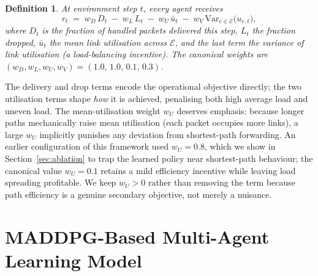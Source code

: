 \documentclass[10pt,journal,comsoc]{IEEEtran}
\newtheorem{definition}{Definition}
\begin{document}
\begin{definition}
  \label{def:reward_function}
  At environment step $t$, every agent receives
  \begin{equation}
    r_t \;=\; w_D\, D_t \;-\; w_L\, L_t \;-\; w_U\, \bar{u}_t \;-\; w_V\, \mathrm{Var}_{e\in\mathcal{E}}\big(u_{e,t}\big),
    \label{eq:reward_function}
  \end{equation}
  where $D_t$ is the fraction of handled packets delivered this step, $L_t$ the fraction dropped, $\bar{u}_t$ the mean link utilisation across $\mathcal{E}$, and the last term the variance of link utilisation (a load-balancing incentive). The canonical weights are $(w_D, w_L, w_U, w_V) = (1.0,\, 1.0,\, 0.1,\, 0.3)$.
\end{definition}

The delivery and drop terms encode the operational objective directly; the two utilisation terms shape \emph{how} it is achieved, penalising both high average load and uneven load. The mean-utilisation weight $w_U$ deserves emphasis: because longer paths mechanically raise mean utilisation (each packet occupies more links), a large $w_U$ implicitly punishes any deviation from shortest-path forwarding. An earlier configuration of this framework used $w_U = 0.8$, which we show in Section~\ref{sec:ablation} to trap the learned policy near shortest-path behaviour; the canonical value $w_U = 0.1$ retains a mild efficiency incentive while leaving load spreading profitable. We keep $w_U > 0$ rather than removing the term because path efficiency is a genuine secondary objective, not merely a nuisance.

\section{MADDPG-Based Multi-Agent Learning Model}
\label{sec:maddpg}
\end{document}
